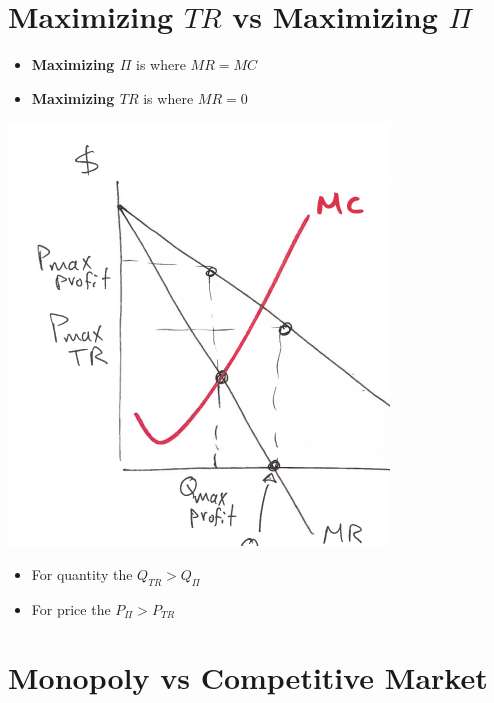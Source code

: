 \documentclass[../ECON-281-Notes.tex]{subfiles}
\begin{document}
\section{Maximizing $TR$ vs Maximizing \(\Pi\) }

\begin{itemize}
    \item \textbf{Maximizing $\Pi$} is where \(MR = MC\)
    \item \textbf{Maximizing $TR$} is where \(MR = 0\)
\end{itemize}

\includegraphics[width=\columnwidth]{assets/image-2021-12-11-12-42-48.png}

\begin{itemize}
    \item For quantity the \(Q_{TR} > Q_{\Pi}\)
    \item For price the \(P_{\Pi} > P_{TR}\)
\end{itemize}




\section{Monopoly vs Competitive Market}
\end{document}
